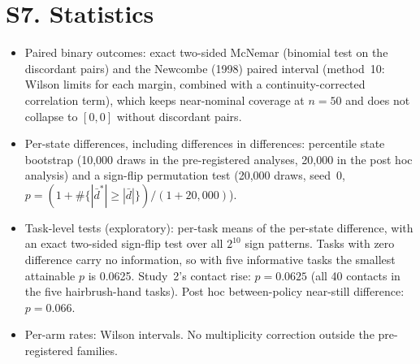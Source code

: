 \documentclass{article}
\begin{document}
\section*{S7. Statistics}
\begin{itemize}\setlength{\itemsep}{0pt}
\item Paired binary outcomes: exact two-sided McNemar (binomial test on the discordant pairs) and the Newcombe (1998) paired interval (method~10: Wilson limits for each margin, combined with a continuity-corrected correlation term), which keeps near-nominal coverage at $n=50$ and does not collapse to $[0,0]$ without discordant pairs.
\item Per-state differences, including differences in differences: percentile state bootstrap (10{,}000 draws in the pre-registered analyses, 20{,}000 in the post hoc analysis) and a sign-flip permutation test (20{,}000 draws, seed~0, $p=(1+\#\{|\bar d^*|\ge|\bar d|\})/(1+20{,}000)$).
\item Task-level tests (exploratory): per-task means of the per-state difference, with an exact two-sided sign-flip test over all $2^{10}$ sign patterns. Tasks with zero difference carry no information, so with five informative tasks the smallest attainable $p$ is 0.0625. Study~2's contact rise: $p=0.0625$ (all 40 contacts in the five hairbrush-hand tasks). Post hoc between-policy near-still difference: $p=0.066$.
\item Per-arm rates: Wilson intervals. No multiplicity correction outside the pre-registered families.
\end{itemize}
\end{document}
